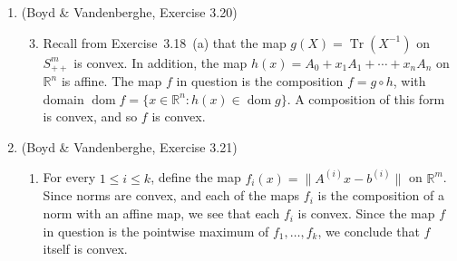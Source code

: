 \documentclass[letterpaper,12pt]{article}
\DeclareMathOperator{\Tr}{Tr}
\DeclareMathOperator{\dom}{dom}
\begin{document}
\begin{enumerate}
\item (Boyd \& Vandenberghe, Exercise 3.20)
\begin{enumerate}
\setcounter{enumii}{2}
\item Recall from Exercise~3.18~(a) that the map $g(X) = \Tr(X^{-1})$
  on $S^m_{++}$ is convex. In addition, the map
  $h(x) = A_0 + x_1 A_1 + \cdots + x_n A_n$ on $\mathbb{R}^n$ is
  affine. The map $f$ in question is the composition $f = g \circ h$,
  with domain $\dom f = \{x \in \mathbb{R}^n : h(x) \in \dom g\}$. A
  composition of this form is convex, and so $f$ is convex.
\end{enumerate}

\item (Boyd \& Vandenberghe, Exercise 3.21)
\begin{enumerate}
\item For every $1 \leq i \leq k$, define the map
  $f_i(x) = \lVert A^{(i)}x - b^{(i)} \rVert$ on $\mathbb{R}^m$. Since
  norms are convex, and each of the maps $f_i$ is the composition of a
  norm with an affine map, we see that each $f_i$ is convex. Since the
  map $f$ in question is the pointwise maximum of $f_1, \ldots, f_k$,
  we conclude that $f$ itself is convex.
\end{enumerate}

\end{enumerate}
\end{document}
